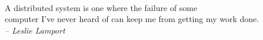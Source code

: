 \begin{titlepage}
	~\\ \vfill \noindent 
	A distributed system is one where the failure of some \\
	computer I've never heard of can keep me from getting my work done. \\
	\textit{-- Leslie Lamport}
\end{titlepage}

